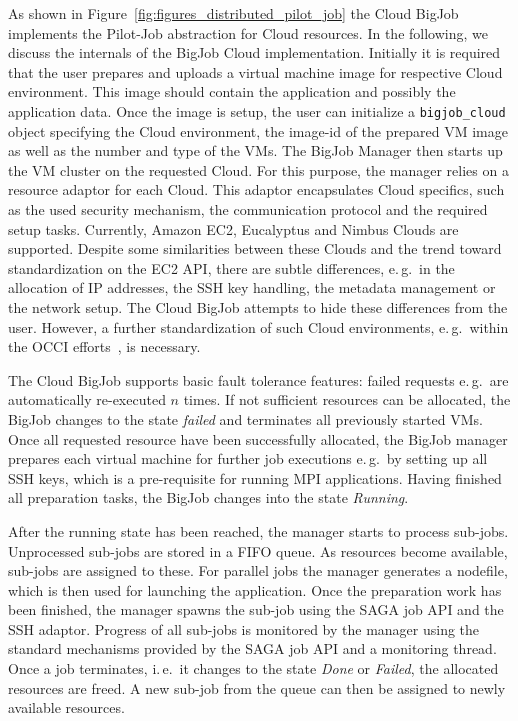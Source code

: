 \documentclass[conference,final]{IEEEtran}
\begin{document}
As shown in Figure~\ref{fig:figures_distributed_pilot_job} the Cloud BigJob implements
the Pilot-Job abstraction for Cloud resources. In the following, we discuss
the internals of the BigJob Cloud implementation. Initially it is required that the user
prepares and uploads a virtual machine image for respective Cloud environment. 
This image should contain the application and possibly the
application data. Once the image is setup, the user can initialize a
\texttt{bigjob\_cloud} object specifying the Cloud environment, 
the image-id of the prepared VM image as well as the number and type of the VMs. The 
BigJob Manager then starts up the VM cluster on the requested Cloud. 
For this purpose, the manager relies on a resource adaptor
for each Cloud. This adaptor encapsulates Cloud specifics, such as the used
security mechanism, the communication protocol and the required setup tasks. Currently,
Amazon EC2, Eucalyptus and Nimbus Clouds are supported. Despite some similarities
between these Clouds and the trend toward standardization on the
EC2 API, there are subtle differences, e.\,g.\ in the allocation
of IP addresses, the SSH key handling, the metadata management or 
the network setup. The Cloud BigJob attempts to hide these differences 
from the user. However, a further standardization of such Cloud environments, 
e.\,g.\ within the OCCI efforts~\cite{occi}, is necessary.

The Cloud BigJob supports basic fault tolerance features: failed requests e.\,g.\
are automatically re-executed $n$ times. If not sufficient resources can be
allocated, the BigJob changes to the state \emph{failed} and terminates all previously
started VMs. Once all requested resource have been successfully allocated, the BigJob manager
prepares each virtual machine for further job executions e.\,g.\ by setting
up all SSH keys, which is a pre-requisite for running MPI applications.
Having finished all preparation tasks, the BigJob changes into the state
\emph{Running}. 

After the running state has been reached, the manager starts to
process sub-jobs.  Unprocessed sub-jobs are stored in a FIFO queue. As
resources become available, sub-jobs are assigned to these. For
parallel jobs the manager generates a nodefile, which is then used for
launching the application. Once the preparation work has been
finished, the manager spawns the sub-job using the SAGA job API and
the SSH adaptor. Progress of all sub-jobs is monitored by the
manager using the standard mechanisms provided by the SAGA job API and
a monitoring thread. Once a job terminates, i.\,e.\ it changes to the
state \emph{Done} or \emph{Failed}, the allocated resources are freed.
A new sub-job from the queue can then be assigned to newly available
resources.
\end{document}
